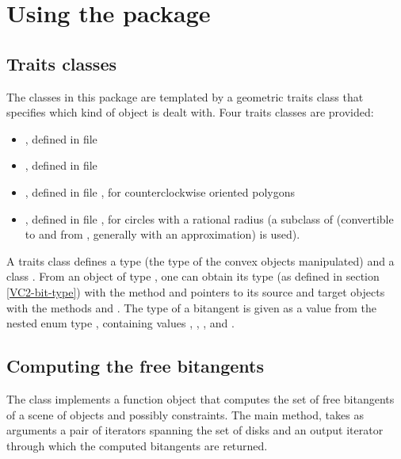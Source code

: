 \section{Using the package}

\subsection{Traits classes}
The classes in this package are templated by a geometric traits class that
specifies which kind of object is dealt with. Four traits classes are
provided:
\begin{itemize}
\item {}, defined in
file 
\item {}, defined in
file 
\item {}, defined in
file , for counterclockwise
oriented polygons
\item {}, defined in file
, for circles with a
rational radius (a subclass of  (convertible to and from
, generally with an approximation) is used).
\end{itemize}

A traits class defines a type  (the type of the convex objects
manipulated) and a class . From an object of type
, one can obtain its type (as defined in section
\ref{VC2-bit-type}) with the method  and pointers to its source
and target objects with the methods  and
. The type of a bitangent is given as a value from the
nested enum type , containing values ,
, , and .

\subsection{Computing the free bitangents}
The class  implements a
function object that computes the set of free bitangents of a scene of
objects and possibly constraints. The main method,  takes
as arguments a pair of iterators spanning the set of disks and an output
iterator through which the computed bitangents are returned.

